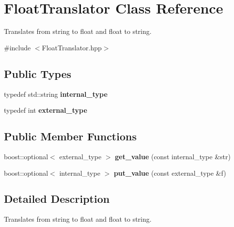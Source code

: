 \hypertarget{struct_float_translator}{}\section{Float\+Translator Class Reference}
\label{struct_float_translator}


Translates from {\ttfamily string} to {\ttfamily float} and {\ttfamily float} to {\ttfamily string}.  




{\ttfamily \#include $<$Float\+Translator.\+hpp$>$}

\subsection*{Public Types}
\begin{DoxyCompactItemize}
\item 
\mbox{\label{struct_float_translator_a840fb034e48966a9a95b882d85b30a10}} 
typedef std\+::string {\bfseries internal\+\_\+type}
\item 
\mbox{\label{struct_float_translator_af69548d24fda6dd74a9e205e8db3908b}} 
typedef int {\bfseries external\+\_\+type}
\end{DoxyCompactItemize}
\subsection*{Public Member Functions}
\begin{DoxyCompactItemize}
\item 
\mbox{\label{struct_float_translator_abc5c5206c051df622466be2e020eab6e}} 
boost\+::optional$<$ external\+\_\+type $>$ {\bfseries get\+\_\+value} (const internal\+\_\+type \&str)
\item 
\mbox{\label{struct_float_translator_a7ff63264631bcc9fb32e806230b0b952}} 
boost\+::optional$<$ internal\+\_\+type $>$ {\bfseries put\+\_\+value} (const external\+\_\+type \&f)
\end{DoxyCompactItemize}


\subsection{Detailed Description}
Translates from {\ttfamily string} to {\ttfamily float} and {\ttfamily float} to {\ttfamily string}. 

